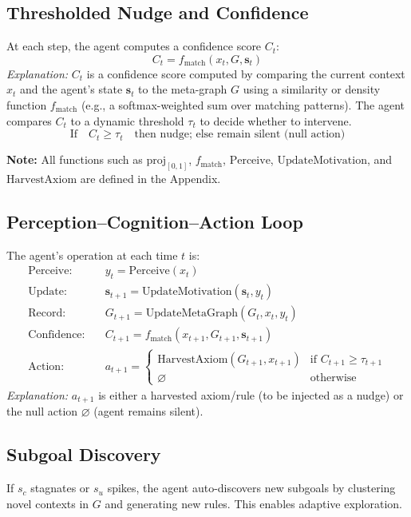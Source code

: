 \documentclass[11pt]{article}
\begin{document}
\subsection{Thresholded Nudge and Confidence}
At each step, the agent computes a confidence score $C_t$:
\[
  C_t = f_\mathrm{match}(x_t, G, \mathbf{s}_t)
\]
\textit{Explanation:} $C_t$ is a confidence score computed by comparing the current context $x_t$ and the agent's state $\mathbf{s}_t$ to the meta-graph $G$ using a similarity or density function $f_\mathrm{match}$ (e.g., a softmax-weighted sum over matching patterns). The agent compares $C_t$ to a dynamic threshold $\tau_t$ to decide whether to intervene.
\[
  \text{If}\quad C_t \geq \tau_t\quad \text{then nudge; else remain silent (null action)}
\]

\textbf{Note:} All functions such as $\mathrm{proj}_{[0,1]}$, $f_\mathrm{match}$, $\mathrm{Perceive}$, $\mathrm{UpdateMotivation}$, and $\mathrm{HarvestAxiom}$ are defined in the Appendix.

\subsection{Perception--Cognition--Action Loop}
The agent's operation at each time $t$ is:
\begin{align*}
  \text{Perceive:} &\quad y_t = \mathrm{Perceive}(x_t) \\
  \text{Update:} &\quad \mathbf{s}_{t+1} = \mathrm{UpdateMotivation}(\mathbf{s}_t, y_t) \\
  \text{Record:} &\quad G_{t+1} = \mathrm{UpdateMetaGraph}(G_t, x_t, y_t) \\
  \text{Confidence:} &\quad C_{t+1} = f_\mathrm{match}(x_{t+1}, G_{t+1}, \mathbf{s}_{t+1}) \\
  \text{Action:} &\quad a_{t+1} = \begin{cases}
    \mathrm{HarvestAxiom}(G_{t+1}, x_{t+1}) & \text{if } C_{t+1} \geq \tau_{t+1} \\
    \varnothing & \text{otherwise}
  \end{cases}
\end{align*}
\textit{Explanation:} $a_{t+1}$ is either a harvested axiom/rule (to be injected as a nudge) or the null action $\varnothing$ (agent remains silent).
\subsection{Subgoal Discovery}
If $s_c$ stagnates or $s_u$ spikes, the agent auto-discovers new subgoals by clustering novel contexts in $G$ and generating new rules. This enables adaptive exploration.
\end{document}
